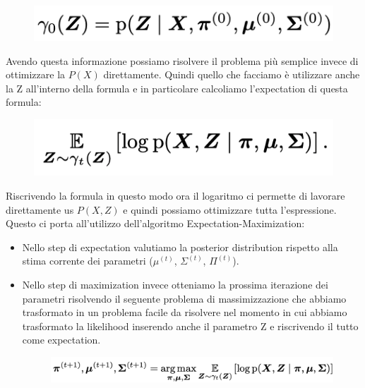 \documentclass[14pt]{extreport}
\begin{document}
\begin{figure}[H] 
\centering
\includegraphics[width=0.7\linewidth]{550.jpeg}
\end{figure}

Avendo questa informazione possiamo risolvere il problema più semplice invece di ottimizzare la $P(X)$ direttamente.
Quindi quello che facciamo è utilizzare anche la Z all'interno della formula e in particolare calcoliamo l'expectation di questa formula:


\begin{figure}[H] 
\centering
\includegraphics[width=0.7\linewidth]{551.jpeg}
\end{figure}

Riscrivendo la formula in questo modo ora il logaritmo ci permette di lavorare direttamente us $P(X,Z)$ e quindi possiamo ottimizzare tutta l'espressione.
Questo ci porta all'utilizzo dell'algoritmo Expectation-Maximization:
\begin{itemize}
\item Nello step di expectation valutiamo la posterior distribution rispetto alla stima corrente dei parametri ($\mu^{(t)}$, $\Sigma^{(t)}$, $\Pi^{(t)}$).
\item Nello step di maximization invece otteniamo la prossima iterazione dei parametri risolvendo il seguente problema di massimizzazione che abbiamo trasformato
in un problema facile da risolvere nel momento in cui abbiamo trasformato la likelihood inserendo anche il parametro Z e riscrivendo il tutto come expectation.

\begin{figure}[H] 
\centering
\includegraphics[width=0.7\linewidth]{552.jpeg}
\end{figure}
\end{itemize}
\end{document}
